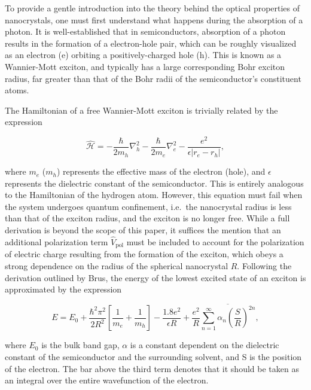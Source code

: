\documentclass[journal = jceda8, manuscript = article]{achemso}
\newcommand{\hamil}{\hat{\mathcal{H}}}
\begin{document}
To provide a gentle introduction into the theory behind the optical properties
of nanocrystals, one must first understand what happens during the absorption of
a photon. It is well-established that in semiconductors, absorption of a photon
results in the formation of a electron-hole pair, which can be roughly
visualized as an electron (e) orbiting a positively-charged hole (h).
\cite{semiconductor-text, excitons} This is known as a Wannier-Mott exciton, and
typically has a large corresponding Bohr exciton radius, far greater than that
of the Bohr radii of the semiconductor's constituent atoms.

The Hamiltonian of a free Wannier-Mott exciton is trivially related by the
expression

\begin{equation}
		\hamil = - \frac{\hbar}{2 m_h} \nabla_h^2
		         - \frac{\hbar}{2 m_e} \nabla_e^2
			 - \frac{e^2}{\epsilon |r_e - r_h|},
\end{equation}

where $m_e$ ($m_h$) represents the effective mass of the electron (hole), and
$\epsilon$ represents the dielectric constant of the semiconductor. This is
entirely analogous to the Hamiltonian of the hydrogen atom. However, this
equation must fail when the system undergoes quantum confinement, i.e.\ the
nanocrystal radius is less than that of the exciton radius, and the exciton is
no longer free.  While a full derivation is beyond the scope of this paper, it
suffices the mention that an additional polarization term $\hat V_\text{pol}$
must be included to account for the polarization of electric charge resulting
from the formation of the exciton, which obeys a strong dependence on the radius
of the spherical nanocrystal $R$. Following the derivation outlined by Brus, the
energy of the lowest excited state of an exciton is approximated by the
expression \cite{exciton_energy}

\begin{equation}
E = E_0 + \frac{\hbar^2\pi^2}{2R^2} \left[ \frac{1}{m_e} + \frac{1}{m_h} \right]
    - \frac{1.8 e^2}{\epsilon R}
    + \frac{e^2}{R} \overline{\sum^{\infty}_{n = 1} \alpha_n \left( \frac{S}{R} \right)^{2n}},
\end{equation}

where $E_0$ is the bulk band gap, $\alpha$ is a constant dependent on the
dielectric constant of the semiconductor and the surrounding solvent, and S is
the position of the electron. The bar above the third term denotes that it
should be taken as an integral over the entire wavefunction of the electron.
\end{document}
